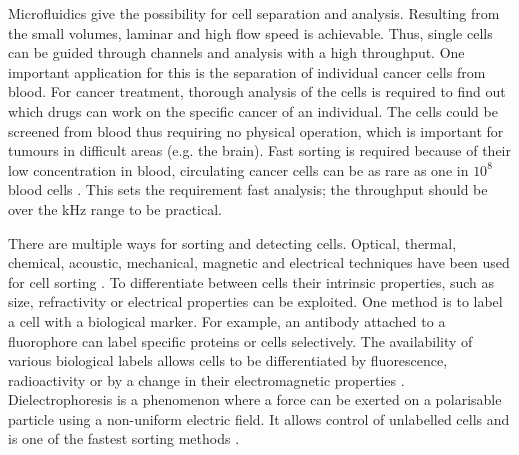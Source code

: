 \documentclass[final]{jyflluk}
\begin{document}
Microfluidics give the possibility for cell separation and analysis. Resulting from the small volumes, laminar and high flow speed is achievable. Thus, single cells can be guided through channels and analysis with a high throughput. One important application for this is the separation of individual cancer cells from blood. For cancer treatment, thorough analysis of the cells is required to find out which drugs can work on the specific cancer of an individual. The cells could be screened from blood thus requiring no physical operation, which is important for tumours in difficult areas (e.g. the brain). Fast sorting is required because of their low concentration in blood, circulating cancer cells can be as rare as one in $10^8$ blood cells \cite{huang_enrichment_2013}. This sets the requirement fast analysis; the throughput should be over the kHz range to be practical. 

There are multiple ways for sorting and detecting cells. Optical, thermal, chemical, acoustic, mechanical, magnetic and electrical techniques have been used for cell sorting \cite{ahn_dielectrophoretic_2006,zhang_towards_2015, voldman_electrical_2006}. To differentiate between cells their intrinsic properties, such as size, refractivity or electrical properties can be exploited. One method is to label a cell with a biological marker.  For example, an antibody attached to a fluorophore can label specific proteins or cells selectively. The availability of various biological labels allows cells to be differentiated by fluorescence, radioactivity or by a change in their electromagnetic properties \cite{wilhelm_universal_2008}. Dielectrophoresis is a phenomenon where a force can be exerted on a polarisable particle using a non-uniform electric field. It allows control of unlabelled cells and is one of the fastest sorting methods \cite{zhang_towards_2015}.
\end{document}
